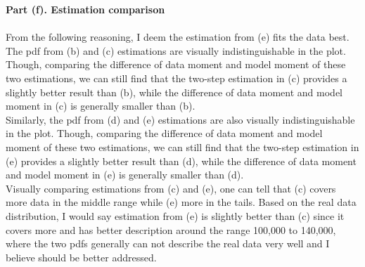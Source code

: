 \documentclass[letterpaper,12pt]{article}
\theoremstyle{definition}
\begin{document}
\noindent\textbf{Part (f). Estimation comparison} \\
\\
From the following reasoning, I deem the estimation from (e) fits the data best. \\
The pdf from (b) and (c) estimations are visually indistinguishable in the plot. Though, comparing the difference of data moment and model moment of these two estimations, we can still find that the two-step estimation in (c) provides a slightly better result than (b), while the difference of data moment and model moment in (c) is generally smaller than (b). \\
Similarly, the pdf from (d) and (e) estimations are also visually indistinguishable in the plot. Though, comparing the difference of data moment and model moment of these two estimations, we can still find that the two-step estimation in (e) provides a slightly better result than (d), while the difference of data moment and model moment in (e) is generally smaller than (d). \\
Visually comparing estimations from (c) and (e), one can tell that (c) covers more data in the middle range while (e) more in the tails. Based on the real data distribution, I would say estimation from (e) is slightly better than (c) since it covers more and has better description around the range 100,000 to 140,000, where the two pdfs generally can not describe the real data very well and I believe should be better addressed.

\begin{figure}[htb]\centering\captionsetup{width=6.0in}
  \caption{\textbf{}}
\end{figure} \\
\\
\\
\\
\clearpage
\end{document}
